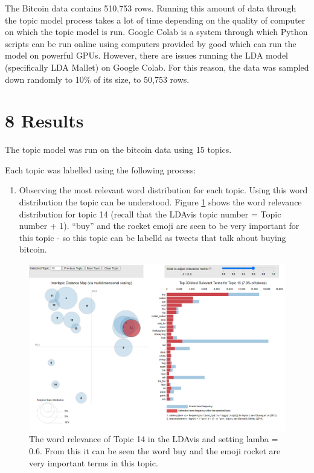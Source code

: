 \documentclass[
]{article}
\providecommand{\tightlist}{%
  \setlength{\itemsep}{0pt}\setlength{\parskip}{0pt}}
\begin{document}
The Bitcoin data contains 510,753 rows. Running this amount of data
through the topic model process takes a lot of time depending on the
quality of computer on which the topic model is run. Google Colab is a
system through which Python scripts can be run online using computers
provided by good which can run the model on powerful GPUs. However,
there are issues running the LDA model (specifically LDA Mallet) on
Google Colab. For this reason, the data was sampled down randomly to
10\% of its size, to 50,753 rows.

\hypertarget{results}{%
\section{8 Results}\label{results}}

The topic model was run on the bitcoin data using 15 topics.

Each topic was labelled using the following process:

\begin{enumerate}
\def\labelenumi{\arabic{enumi}.}
\tightlist
\item
  Observing the most relevant word distribution for each topic. Using
  this word distribution the topic can be understood. Figure
  \ref{fig:ldavis3} shows the word relevance distribution for topic 14
  (recall that the LDAvis topic number = Topic number + 1). ``buy'' and
  the rocket emoji are seen to be very important for this topic - so
  this topic can be labelld as tweets that talk about buying bitcoin.
\end{enumerate}

\begin{figure}

{\centering \includegraphics[width=1\linewidth]{images/ldavis3} 

}

\caption{The word relevance of Topic 14 in the LDAvis and setting lamba = 0.6. From this it can be seen the word buy and the emoji rocket are very important terms in this topic. }\label{fig:ldavis3}
\end{figure}
\end{document}
